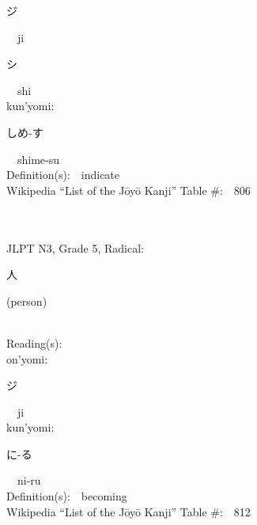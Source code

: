 \begin{multicols}{2}
{\hspace*{2em}}{\begin{CJK}{UTF8}{min} ジ \end{CJK}}\ \ ji\ \ \\
{\hspace*{2em}}{\begin{CJK}{UTF8}{min} シ \end{CJK}}\ \ shi\ \ \\
{\hspace*{1em}}kun'yomi:\ \ \\
{\hspace*{2em}}{\begin{CJK}{UTF8}{min} しめ-す \end{CJK}}\ \ shime-su\ \ \\
Definition(s):\ \ indicate \\
Wikipedia ``List of the J\=oy\=o Kanji'' Table \#:\ \ 806 \\
\ \ \\
{\fontsize{34pt}{40pt}  }\ \ \\  %
{JLPT N3, Grade 5, Radical:\ \ {\begin{CJK}{UTF8}{min} 人 \end{CJK}} (person) } \\
Reading(s):\ \ \\
{\hspace*{1em}}on'yomi:\ \ \\
{\hspace*{2em}}{\begin{CJK}{UTF8}{min} ジ \end{CJK}}\ \ ji\ \ \\
{\hspace*{1em}}kun'yomi:\ \ \\
{\hspace*{2em}}{\begin{CJK}{UTF8}{min} に-る \end{CJK}}\ \ ni-ru\ \ \\
Definition(s):\ \ becoming \\
Wikipedia ``List of the J\=oy\=o Kanji'' Table \#:\ \ 812 \\
\ \ \\
{\fontsize{34pt}{40pt}  }\ \ \\  %

\end{multicols}
